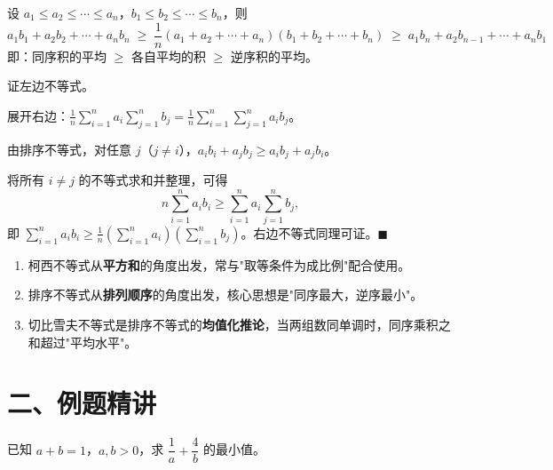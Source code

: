 \documentclass[12pt, a4paper]{ctexart}
\begin{document}
\begin{knowledgebox}[切比雪夫不等式]
设 $a_1 \leqslant a_2 \leqslant \cdots \leqslant a_n$，$b_1 \leqslant b_2 \leqslant \cdots \leqslant b_n$，则
\[
  \boxed{a_1 b_1 + a_2 b_2 + \cdots + a_n b_n \;\geqslant\; \frac{1}{n}(a_1 + a_2 + \cdots + a_n)(b_1 + b_2 + \cdots + b_n) \;\geqslant\; a_1 b_n + a_2 b_{n-1} + \cdots + a_n b_1}
\]
即：同序积的平均 $\geqslant$ 各自平均的积 $\geqslant$ 逆序积的平均。
\end{knowledgebox}

\begin{knowledgebox}
证左边不等式。

展开右边：$\displaystyle\frac{1}{n}\sum_{i=1}^n a_i \sum_{j=1}^n b_j = \frac{1}{n}\sum_{i=1}^n \sum_{j=1}^n a_i b_j$。

由排序不等式，对任意 $j$（$j \neq i$），$a_i b_i + a_j b_j \geqslant a_i b_j + a_j b_i$。

将所有 $i \neq j$ 的不等式求和并整理，可得
\[
  n \sum_{i=1}^n a_i b_i \geqslant \sum_{i=1}^n a_i \sum_{j=1}^n b_j,
\]
即 $\displaystyle\sum_{i=1}^n a_i b_i \geqslant \frac{1}{n}\left(\sum_{i=1}^n a_i\right)\left(\sum_{i=1}^n b_j\right)$。右边不等式同理可证。\hfill $\blacksquare$
\end{knowledgebox}

\begin{tipbox}[三大不等式的联系]
\begin{enumerate}[leftmargin=1.5em]
  \item 柯西不等式从\textbf{平方和}的角度出发，常与"取等条件为成比例"配合使用。
  \item 排序不等式从\textbf{排列顺序}的角度出发，核心思想是"同序最大，逆序最小"。
  \item 切比雪夫不等式是排序不等式的\textbf{均值化推论}，当两组数同单调时，同序乘积之和超过"平均水平"。
\end{enumerate}
\end{tipbox}

\section*{\textcolor{examorange}{二、例题精讲}}

\begin{examplebox}[【例题1】柯西不等式基本应用]
已知 $a + b = 1$，$a, b > 0$，求 $\dfrac{1}{a} + \dfrac{4}{b}$ 的最小值。
\end{examplebox}
\end{document}

